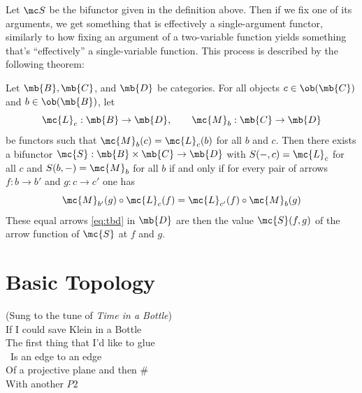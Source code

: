 \documentclass{fkbook}
\theoremstyle{snazzydefinition}
\begin{document}
\begin{adjustwidth}{1em}{1em}
  Let $\mc S$ be the bifunctor given in the definition above. Then if
  we fix one of its arguments, we get something that is effectively a
  single-argument functor, similarly to how fixing an argument of a
  two-variable function yields something that's ``effectively'' a
  single-variable function. This process is described by the following
  theorem:
  \begin{theorem}
    Let $\mb{B}, \mb{C}$, and $\mb{D}$ be categories. For all objects
    $c \in \ob(\mb{C})$ and $b \in \ob(\mb{B})$, let
    \[
      \mc{L}_{c} : \mb{B} \to \mb{D}, \qquad \mc{M}_b : \mb{C} \to
      \mb{D}
    \]
    be functors such that $\mc{M}_b(c) = \mc{L}_c(b)$ for all $b$ and
    $c$. Then there exists a bifunctor $\mc{S} : \mb{B} \times \mb{C}
    \to \mb{D}$ with $S(-, c) = \mc{L}_c$ for all $c$ and $S(b, -) =
    \mc{M}_b$ for all $b$ if and only if for every pair of arrows $f :
    b \to b'$ and $g : c \to c'$ one has
    \begin{equation}
      \mc{M}_{b'}(g) \circ \mc{L}_c(f) = \mc{L}_{c'}(f) \circ
      \mc{M}_b(g) \label{eq:tbd}
    \end{equation}
    These equal arrows \ref{eq:tbd} in $\mb{D}$ are then the value
    $\mc{S}(f,g)$ of the arrow function of $\mc{S}$ at $f$ and $g$.
  \end{theorem}

\end{adjustwidth}


\chapter{Basic Topology}

\begin{center}
  \begin{minipage}[H]{.4\linewidth}
  (Sung to the tune of \emph{Time in a Bottle}) \\
  If I could save Klein in a Bottle \\
  The first thing that I'd like to glue\\\
  Is an edge to an edge\\
  Of a projective plane and then $\#$ \\
  With another $P2$
  \end{minipage}
\end{center}
\end{document}
